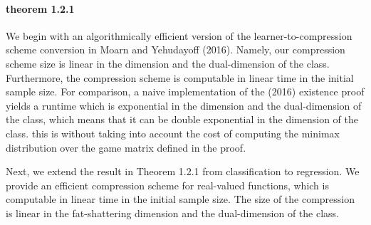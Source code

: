 \documentclass{article}
\begin{document}
\paragraph{theorem 1.2.1}
We begin with an algorithmically efficient version of the learner-to-compression scheme conversion in Moarn and Yehudayoff (2016).
Namely, our compression scheme size is linear in the dimension and the dual-dimension of the class. 
Furthermore, the compression scheme is computable in linear time in the initial sample size. 
For comparison,  a naive implementation of the   (2016) existence proof yields a runtime which is exponential in the dimension and the dual-dimension of the class, which means that it can be double exponential in the dimension of the class. this is without taking into account the cost of computing the minimax distribution over the game matrix defined in the proof. 

Next, we extend the result in Theorem 1.2.1 from classification to regression.
We provide an efficient  compression scheme for real-valued functions, which is computable in linear time in the initial sample size. The size of the compression is linear in the fat-shattering dimension and the dual-dimension of the class. 
\end{document}
